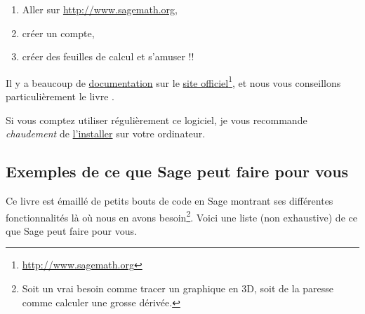 \begin{enumerate}
	\item
        Aller sur \url{http://www.sagemath.org},
	\item
		créer un compte,
	\item
		créer des feuilles de calcul et s'amuser !!
\end{enumerate}

Il y a beaucoup de \href{http://lmgtfy.com/?q=sage+documentation}{documentation} sur le \href{http://www.sagemath.org}{site officiel}\footnote{\href{http://www.sagemath.org}{http://www.sagemath.org}}, et nous vous conseillons particulièrement le livre \cite{ooBLMMooWTPsQy}.

Si vous comptez utiliser régulièrement ce logiciel, je vous recommande \emph{chaudement} de \href{http://mirror.switch.ch/mirror/sagemath/index.html}{l'installer} sur votre ordinateur.

\subsection{Exemples de ce que Sage peut faire pour vous}

Ce livre est émaillé de petits bouts de code en Sage montrant ses différentes fonctionnalités là où nous en avons besoin\footnote{Soit un vrai besoin comme tracer un graphique en 3D, soit de la paresse comme calculer une grosse dérivée.}. Voici une liste (non exhaustive) de ce que Sage peut faire pour vous.

